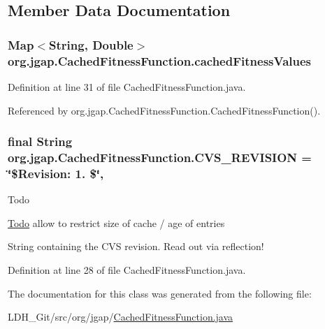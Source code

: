 \subsection{Member Data Documentation}
\hypertarget{classorg_1_1jgap_1_1_cached_fitness_function_a050080fb109ccbf262449ded034f08b4}{
\subsubsection[{cached\-Fitness\-Values}]{\setlength{\rightskip}{0pt plus 5cm}Map$<$String, Double$>$ org.\-jgap.\-Cached\-Fitness\-Function.\-cached\-Fitness\-Values\hspace{0.3cm}{\ttfamily [private]}}}\label{classorg_1_1jgap_1_1_cached_fitness_function_a050080fb109ccbf262449ded034f08b4}


Definition at line 31 of file Cached\-Fitness\-Function.\-java.



Referenced by org.\-jgap.\-Cached\-Fitness\-Function.\-Cached\-Fitness\-Function().

\hypertarget{classorg_1_1jgap_1_1_cached_fitness_function_ab281e35d33336f473dcc8a252ebcc932}{
\subsubsection[{C\-V\-S\-\_\-\-R\-E\-V\-I\-S\-I\-O\-N}]{\setlength{\rightskip}{0pt plus 5cm}final String org.\-jgap.\-Cached\-Fitness\-Function.\-C\-V\-S\-\_\-\-R\-E\-V\-I\-S\-I\-O\-N = \char`\"{}\$Revision\-: 1. \$\char`\"{}\hspace{0.3cm}{\ttfamily [static]}, {\ttfamily [private]}}}\label{classorg_1_1jgap_1_1_cached_fitness_function_ab281e35d33336f473dcc8a252ebcc932}
\begin{DoxyRefDesc}{Todo}
\item[\hyperlink{todo__todo000047}{Todo}]allow to restrict size of cache / age of entries \end{DoxyRefDesc}
String containing the C\-V\-S revision. Read out via reflection! 

Definition at line 28 of file Cached\-Fitness\-Function.\-java.



The documentation for this class was generated from the following file\-:\begin{DoxyCompactItemize}
\item 
L\-D\-H\-\_\-\-Git/src/org/jgap/\hyperlink{_cached_fitness_function_8java}{Cached\-Fitness\-Function.\-java}\end{DoxyCompactItemize}
